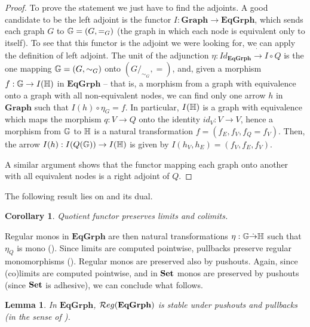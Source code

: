 \documentclass[a4paper, twoside,openright]{report}
\theoremstyle{plain}
\newtheorem{lemma}[theorem]{Lemma}
\newtheorem{cor}[theorem]{Corollary}
\theoremstyle{definition}
\begin{document}
\begin{proof}
    To prove the statement we just have to find the adjoints. 
    A good candidate to be the left adjoint is the functor $I: \mathbf{Graph \rightarrow EqGrph}$, which sends each graph $G$ to $\mathbb{G} = (G, =_G)$ (the graph in which each node is equivalent only to itself). To see that this functor is the adjoint we were looking for, we can apply the definition of left adjoint. The unit of the adjunction $\eta: Id_{\mathbf{EqGrph}} \dot\rightarrow I \circ Q$ is the one mapping $\mathbb{G} = (G, \sim_G)$ onto $(G/_{\sim_G}, =)$,  and, given a morphism $f: \mathbb{G} \rightarrow I(\mathbb{H})$ in $\mathbf{EqGrph}$ -- that is, a morphism from a graph with equivalence onto a graph with all non-equivalent nodes, we can find only one arrow $h$ in $\mathbf{Graph}$ such that $I(h) \circ \eta_{G} = f$.
    In particular, $I(\mathbb{H})$ is a graph with equivalence which maps the morphism $q:V\rightarrow Q$ onto the identity $id_V: V \rightarrow V$, hence a morphism from $\mathbb{G}$ to $\mathbb{H}$ is a natural transformation $f = (f_E, f_V, f_Q = f_V)$. Then, the arrow $I(h): I(Q(\mathbb{G})) \rightarrow I(\mathbb{H})$ is given by $I(h_V, h_E) = (f_V, f_E, f_V)$.

    A similar argument shows that the functor mapping each graph onto another with all equivalent nodes is a right adjoint of $Q$.
\end{proof}

The following result lies on  and its dual.

\begin{cor}\label{cor:quot_preserves_co_lim}
    Quotient functor preserves limits and colimits. 
\end{cor}

Regular monos in $\mathbf{EqGrph}$ are then natural transformations $\eta: \mathbb{G \dot\rightarrow H}$ such that $\eta_Q$ is mono (). Since limits are computed pointwise, pullbacks preserve regular monomorphisms (). Regular monos are preserved also by pushouts. Again, since (co)limits are computed pointwise, and in $\mathbf{Set}$ monos are preserved by pushouts (since $\mathbf{Set}$ is adhesive), we can conclude what follows.

\begin{lemma}\label{lemma:eqgrph_stab_po_pb}
    In $\mathbf{EqGrph}$,  $\mathcal{R}eg(\mathbf{EqGrph})$ is stable under pushouts and pullbacks (in the sense of ).
\end{lemma}
\end{document}
